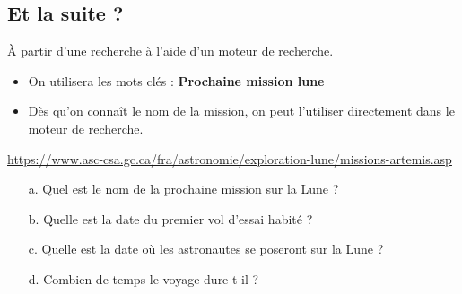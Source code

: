 \subsection*{Et la suite ?}

À partir d'une recherche à l'aide d'un moteur de recherche. 

\begin{itemize}
  \item On utilisera les mots clés : \textbf{Prochaine mission lune}
  \item Dès qu'on connaît le nom de la mission, on peut l'utiliser directement dans le moteur de recherche.
\end{itemize}
\url{https://www.asc-csa.gc.ca/fra/astronomie/exploration-lune/missions-artemis.asp}

\begin{enumerate}
  \item[a.] Quel est le nom de la prochaine mission sur la Lune ? \dotfill
  \item[b.] Quelle est la date du premier vol d'essai habité ? \dotfill
  \item[c.] Quelle est la date où les astronautes se poseront sur la Lune ? \dotfill
  \item[d.] Combien de temps le voyage dure-t-il ? \dotfill
\end{enumerate}


